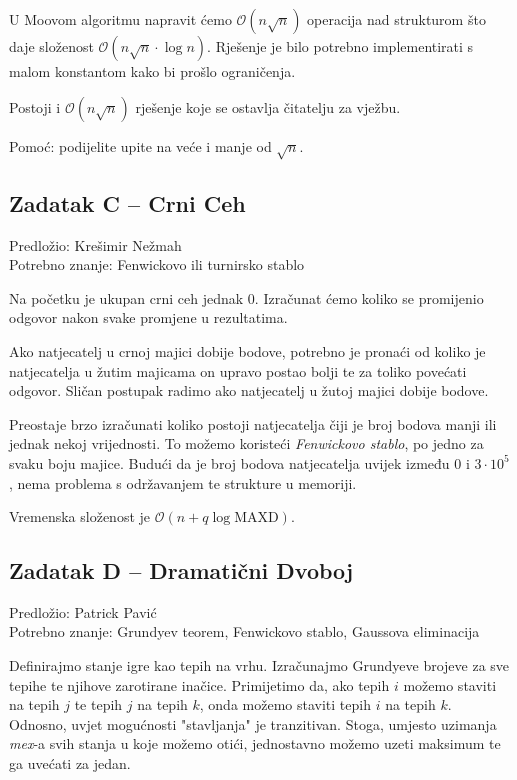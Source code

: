 \documentclass[a4paper]{article}
\begin{document}
U Moovom algoritmu napravit ćemo $\mathcal{O}(n\sqrt{n})$ operacija nad
strukturom što daje složenost $\mathcal{O}(n\sqrt{n}\cdot \log{} n)$. Rješenje
je bilo potrebno implementirati s malom konstantom kako bi prošlo ograničenja.

Postoji i $\mathcal{O}(n\sqrt{n})$ rješenje koje se ostavlja čitatelju za vježbu.

Pomoć: podijelite upite na veće i manje od $\sqrt{n}$.
\clearpage

\subsection*{Zadatak C -- Crni Ceh}
\textsf{Predložio: Krešimir Nežmah}\\
\textsf{Potrebno znanje: Fenwickovo ili turnirsko stablo}

Na početku je ukupan crni ceh jednak $0$. Izračunat ćemo koliko se promijenio
odgovor nakon svake promjene u rezultatima.

Ako natjecatelj u crnoj majici dobije bodove, potrebno je pronaći od koliko je
natjecatelja u žutim majicama on upravo postao bolji te za toliko povećati
odgovor. Sličan postupak radimo ako natjecatelj u žutoj majici dobije bodove.

Preostaje brzo izračunati koliko postoji natjecatelja čiji je broj bodova manji
ili jednak nekoj vrijednosti. To možemo koristeći \textit{Fenwickovo stablo},
po jedno za svaku boju majice. Budući da je broj bodova natjecatelja uvijek
između $0$ i $3\cdot10^5$, nema problema s održavanjem te strukture u memoriji.

Vremenska složenost je $\mathcal{O}(n + q \log{} \text{MAXD})$.

\subsection*{Zadatak D -- Dramatični Dvoboj}
\textsf{Predložio: Patrick Pavić}\\
\textsf{Potrebno znanje: Grundyev teorem, Fenwickovo stablo, Gaussova eliminacija}

Definirajmo stanje igre kao tepih na vrhu. Izračunajmo Grundyeve brojeve za sve
tepihe te njihove zarotirane inačice. Primijetimo da, ako tepih $i$ možemo
staviti na tepih $j$ te tepih $j$ na tepih $k$, onda možemo staviti tepih $i$
na tepih $k$. Odnosno, uvjet mogućnosti "stavljanja" je tranzitivan.
Stoga, umjesto uzimanja \textit{mex}-a svih stanja u koje možemo otići,
jednostavno možemo uzeti maksimum te ga uvećati za jedan.
\end{document}
